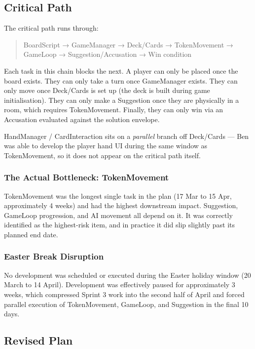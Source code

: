 \subsection{Critical Path}

The critical path runs through:

\begin{quote}
BoardScript → GameManager → Deck/Cards → TokenMovement → GameLoop → Suggestion/Accusation → Win condition
\end{quote}

Each task in this chain blocks the next. A player can only be placed once the board exists. They can only take a turn once GameManager exists. They can only move once Deck/Cards is set up (the deck is built during game initialisation). They can only make a Suggestion once they are physically in a room, which requires TokenMovement. Finally, they can only win via an Accusation evaluated against the solution envelope.

HandManager / CardInteraction sits on a \textit{parallel} branch off Deck/Cards --- Ben was able to develop the player hand UI during the same window as TokenMovement, so it does not appear on the critical path itself.

\subsubsection*{The Actual Bottleneck: TokenMovement}
TokenMovement was the longest single task in the plan (17 Mar to 15 Apr, approximately 4 weeks) and had the highest downstream impact. Suggestion, GameLoop progression, and AI movement all depend on it. It was correctly identified as the highest-risk item, and in practice it did slip slightly past its planned end date.

\subsubsection*{Easter Break Disruption}
No development was scheduled or executed during the Easter holiday window (20 March to 14 April). Development was effectively paused for approximately 3 weeks, which compressed Sprint 3 work into the second half of April and forced parallel execution of TokenMovement, GameLoop, and Suggestion in the final 10 days.

\subsection{Revised Plan}

